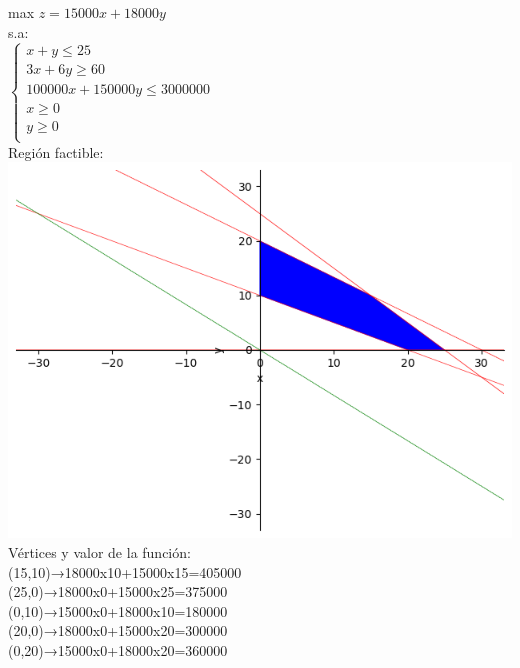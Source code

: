 \documentclass[addpoints,spanish, 12pt,a4paper]{exam}
\begin{document}
\begin{questions}
\begin{solution}
    max $z=15000 x + 18000 y$ \\
    s.a: \\
    $\left\{ \begin{matrix}x+y \leq 25  \\ 3x+6y \geq 60 \\ 100000x+150000y \leq 3000000 \\ x \geq 0 \\ y \geq 0 \\ \end{matrix}\right.$ \\
    Región factible: \\
    \includegraphics[scale=0.30]{pl2022.png} \\
    Vértices y valor de la función: \\

    (15,10)→18000x10+15000x15=405000 \\
    (25,0)→18000x0+15000x25=375000 \\
    (0,10)→15000x0+18000x10=180000 \\
    (20,0)→18000x0+15000x20=300000 \\
    (0,20)→15000x0+18000x20=360000 \\
    

\end{solution}
\end{questions}
\end{document}

